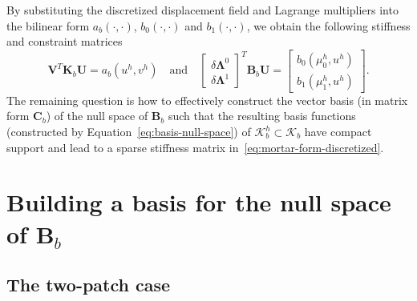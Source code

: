 By substituting the discretized displacement field and Lagrange multipliers into the bilinear form $a_b(\cdot,\cdot)$, $b_0(\cdot,\cdot)$ and $b_1(\cdot,\cdot)$, we obtain the following stiffness and constraint matrices
\begin{equation}
  \mathbf{V}^T\mathbf{K}_b\mathbf{U}=a_b(u^h,v^h)\quad\text{and}\quad
  \begin{bmatrix}
    \delta\mathbf{\Lambda}^0 \\
    \delta\mathbf{\Lambda}^1
  \end{bmatrix}^T\mathbf{B}_b\mathbf{U}=\begin{bmatrix}
    b_0(\mu_0^h,u^h) \\
    b_1(\mu_1^h,u^h)
  \end{bmatrix}.
\end{equation}
The remaining question is how to effectively construct the vector basis (in matrix form $\mathbf{C}_b$) of the null space of $\mathbf{B}_b$ such that the resulting basis functions (constructed by Equation~\eqref{eq:basis-null-space}) of $\mathcal{K}_b^h \subset \mathcal{K}_b$ have compact support and lead to a sparse stiffness matrix in~\eqref{eq:mortar-form-discretized}.

\section{Building a basis for the null space of $\mathbf{B}_b$}

\subsection{The two-patch case}


